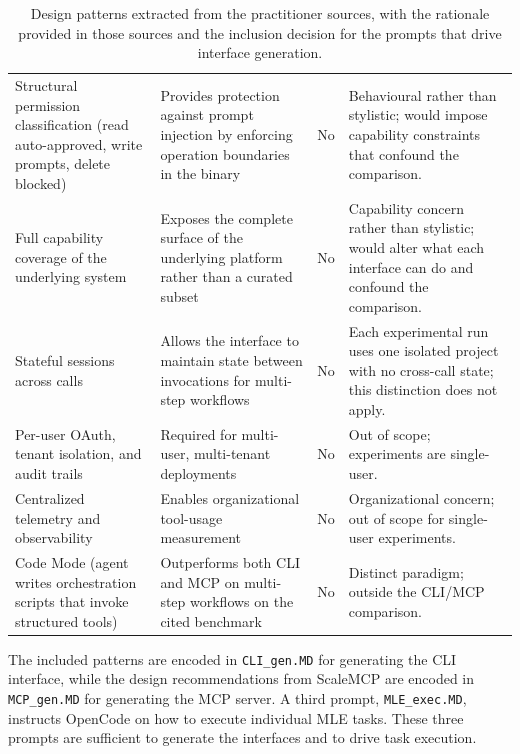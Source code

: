 \documentclass[
english,                 %
bibtex,                  %
includeExtraAbstracts, %
]{kththesis}
\numberwithin{listing}{chapter}
\begin{document}
\begin{table}[H]
{\begin{tabular}{p{4.5cm}p{6cm}p{1.5cm}p{4cm}}
        Structural permission classification (read auto-approved, write prompts, delete blocked) & Provides protection against prompt injection by enforcing operation boundaries in the binary~\cite{amzani_your_2026} & No & Behavioural rather than stylistic; would impose capability constraints that confound the comparison. \\
        Full capability coverage of the underlying system & Exposes the complete surface of the underlying platform rather than a curated subset~\cite{kumak_mcp_2025, schmitt_mcp_2026} & No & Capability concern rather than stylistic; would alter what each interface can do and confound the comparison. \\
        Stateful sessions across calls & Allows the interface to maintain state between invocations for multi-step workflows~\cite{schmitt_mcp_2026} & No & Each experimental run uses one isolated project with no cross-call state; this distinction does not apply. \\
        Per-user \gls{OAuth}, tenant isolation, and audit trails & Required for multi-user, multi-tenant deployments~\cite{madabhushi_mcp_2026, chen_mcp_2026} & No & Out of scope; experiments are single-user. \\
        Centralized telemetry and observability & Enables organizational tool-usage measurement~\cite{chen_mcp_2026} & No & Organizational concern; out of scope for single-user experiments. \\
        Code Mode (agent writes orchestration scripts that invoke structured tools) & Outperforms both \gls{CLI} and \gls{MCP} on multi-step workflows on the cited benchmark~\cite{amzani_your_2026} & No & Distinct paradigm; outside the \gls{CLI}/\gls{MCP} comparison. \\
        \bottomrule
    \end{tabular}%
    }
    \caption{Design patterns extracted from the practitioner sources, with the rationale provided in those sources and the inclusion decision for the prompts that drive interface generation.}
    \label{tab:design-patterns}
\end{table}

The included patterns are encoded in \texttt{CLI\_gen.\gls{MD}} for generating the \gls{CLI} interface, while the design recommendations from Scale\gls{MCP} are encoded in \texttt{MCP\_gen.\gls{MD}} for generating the \gls{MCP} server. A third prompt, \texttt{MLE\_exec.\gls{MD}}, instructs OpenCode on how to execute individual \gls{MLE} tasks. These three prompts are sufficient to generate the interfaces and to drive task execution.
\end{document}
